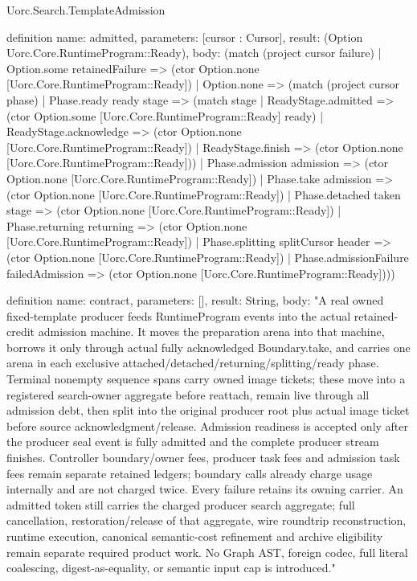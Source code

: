 \begin{lexlean}{Uorc.Search.TemplateAdmission}
\begin{semanticmodule}
definition{
  name: admitted,
  parameters: [cursor : Cursor],
  result: (Option Uorc.Core.RuntimeProgram::Ready),
  body: (match (project cursor failure)
    | Option.some retainedFailure => (ctor Option.none [Uorc.Core.RuntimeProgram::Ready])
    | Option.none => (match (project cursor phase)
      | Phase.ready ready stage => (match stage
        | ReadyStage.admitted => (ctor Option.some [Uorc.Core.RuntimeProgram::Ready] ready)
        | ReadyStage.acknowledge => (ctor Option.none [Uorc.Core.RuntimeProgram::Ready])
        | ReadyStage.finish => (ctor Option.none [Uorc.Core.RuntimeProgram::Ready]))
      | Phase.admission admission => (ctor Option.none [Uorc.Core.RuntimeProgram::Ready])
      | Phase.take admission => (ctor Option.none [Uorc.Core.RuntimeProgram::Ready])
      | Phase.detached taken stage => (ctor Option.none [Uorc.Core.RuntimeProgram::Ready])
      | Phase.returning returning => (ctor Option.none [Uorc.Core.RuntimeProgram::Ready])
      | Phase.splitting splitCursor header => (ctor Option.none [Uorc.Core.RuntimeProgram::Ready])
      | Phase.admissionFailure failedAdmission => (ctor Option.none [Uorc.Core.RuntimeProgram::Ready])))
}

definition{
  name: contract,
  parameters: [],
  result: String,
  body: "A real owned fixed-template producer feeds RuntimeProgram events into the actual retained-credit admission machine. It moves the preparation arena into that machine, borrows it only through actual fully acknowledged Boundary.take, and carries one arena in each exclusive attached/detached/returning/splitting/ready phase. Terminal nonempty sequence spans carry owned image tickets; these move into a registered search-owner aggregate before reattach, remain live through all admission debt, then split into the original producer root plus actual image ticket before source acknowledgment/release. Admission readiness is accepted only after the producer seal event is fully admitted and the complete producer stream finishes. Controller boundary/owner fees, producer task fees and admission task fees remain separate retained ledgers; boundary calls already charge usage internally and are not charged twice. Every failure retains its owning carrier. An admitted token still carries the charged producer search aggregate; full cancellation, restoration/release of that aggregate, wire roundtrip reconstruction, runtime execution, canonical semantic-cost refinement and archive eligibility remain separate required product work. No Graph AST, foreign codec, full literal coalescing, digest-as-equality, or semantic input cap is introduced."
}
\end{semanticmodule}
\end{lexlean}
